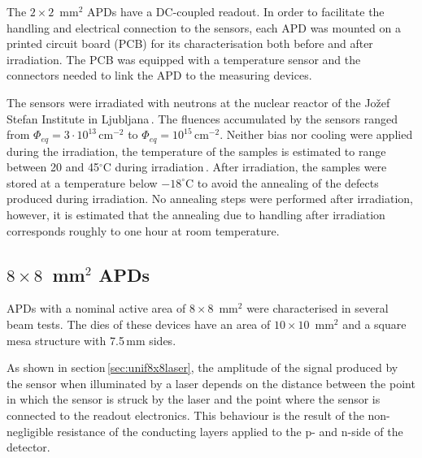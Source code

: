 \documentclass{article}
\begin{document}
The $2 \times 2$~mm$^2$ APDs have a DC-coupled readout.
In order to facilitate the handling and electrical connection to the sensors, each APD was mounted on a printed circuit board (PCB) for its characterisation both before and after irradiation.
The PCB was equipped with a temperature sensor and the connectors needed to link the APD to the measuring devices.

The sensors were irradiated with neutrons at the nuclear reactor of the Jo\v{z}ef Stefan Institute in Ljubljana\,\cite{jsiIrrad}.
The fluences accumulated by the sensors ranged from $\Phi_{eq} = 3 \cdot 10^{13}$\,cm$^{-2}$ to $\Phi_{eq} = 10^{15}$\,cm$^{-2}$.
Neither bias nor cooling were applied during the irradiation, the temperature of the samples is estimated to range between 20 and 45$^\circ$C during irradiation\,\cite{vlado}.
After irradiation, the samples were stored at a temperature below $-18^\circ$C to avoid the annealing of the defects produced during irradiation.
No annealing steps were performed after irradiation, however, it is estimated that the annealing due to handling after irradiation corresponds roughly to one hour at room temperature.

\subsection{$8 \times 8$~mm$^2$ APDs}

APDs with a nominal active area of $8 \times 8$~mm$^2$ were characterised in several beam tests.
The dies of these devices have an area of $10 \times 10$~mm$^2$ and a square mesa structure with 7.5\,mm sides.

As shown in section\,\ref{sec:unif8x8laser}, the amplitude of the signal produced by the sensor when illuminated by a laser depends on the distance between the point in which the sensor is struck by the laser and the point where the sensor is connected to the readout electronics.
This behaviour is the result of the non-negligible resistance of the conducting layers applied to the p- and n-side of the detector.
\end{document}
